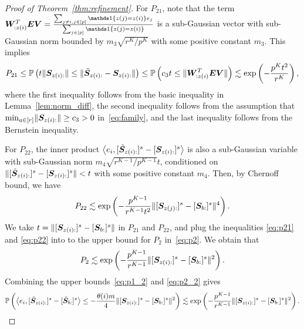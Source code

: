 \documentclass[lettersize,onecolumn,journal]{IEEEtran}
\theoremstyle{definition}
\theoremstyle{definition}
\newcommand{\of}[1]{\left(#1\right)}
\newcommand{\ang}[1]{\left\langle#1\right\rangle}
\begin{document}
\begin{proof}[Proof of Theorem~\ref{thm:refinement}]
    For $P_{21}$, note that the term $\mW^T_{: z(i)} \mE \mV = \frac{ \sum_{ j \neq i, j \in [p]} \ind \{ z(j) = z(i) \} e_j }{\sum_{j \in [p]} \ind \{ z(j) = z(i) \} }$  is a sub-Gaussian vector with sub-Gaussian norm bounded by $m_3 \sqrt{r^K/ p^K}$ with some positive constant $m_3$. This implies
        \begin{align}
        P_{21} \leq \bbP\of{ t \onormSize{}{\mS_{z(i):} } \leq \onormSize{}{ \tilde  \mS_{z(i):}  -  \mS_{z(i):} }  } \leq \bbP\of{c_3 t \leq  \onormSize{}{ \mW^T_{: z(i)} \mE \mV  } } 
        \lesssim \exp\of{ - \frac{p^K t^2}{r^K} }, \label{eq:p21}
    \end{align}
    where the first inequality follows from the basic inequality in Lemma~\ref{lem:norm_diff}, the second inequality follows from the assumption that $ \min_{a \in [r]} \lVert\bm S_{z(i):}\rVert \geq c_3>0$ in~\eqref{eq:family}, and the last inequality follows from the Bernstein inequality.
    
    For $P_{22}$, the inner product $ \ang{e_i, [ \tilde  \mS_{z(i):} ]^s - [ \mS_{z(i):} ]^s}$ is also a sub-Gaussian variable with sub-Gaussian norm $ m_4 \sqrt{ r^{K-1}/ p^{K-1} } t$, conditioned on $\lVert [ \tilde  {\bm S}_{z(i):} ]^s - [ \bm S_{z(i):} ]^s \rVert < t$ with some positive constant $m_4$. Then, by Chernoff bound, we have 
    \begin{equation}\label{eq:p22}
        P_{22} \lesssim \exp \of{  - \frac{p^{K-1}}{r^{K-1} t^2}   \onormSize{}{ [ \mS_{z(j):}  ]^s - [ \mS_{b:}  ]^s  }^4 }. 
    \end{equation}
    We take $t =  \lVert [ \bm S_{z(i):}  ]^s - [ \bm S_{b:}  ]^s  \rVert$ in $P_{21}$ and $P_{22}$, and plug the inequalities \eqref{eq:p21} and \eqref{eq:p22} into to the upper bound for $P_2$ in~\eqref{eq:p2}. We obtain that 
    \begin{equation}\label{eq:p2_2}
        P_2 \lesssim \exp \of{  - \frac{p^{K-1}}{r^{K-1}}   \onormSize{}{ [ \mS_{z(i):}  ]^s - [ \mS_{b:}  ]^s  }^2 }.
    \end{equation}
    Combining the upper bounds~\eqref{eq:p1_2} and \eqref{eq:p2_2} gives 
       \begin{equation}\label{eq:xi_p}
          \bbP \of{ \ang{ e_i, [  \tilde \mS_{z(i):} ]^s - [  \tilde \mS_{b:} ]^s }  \leq - \frac{\theta(i) m}{4} \onormSize{}{ [ \mS_{z(i):}  ]^s - [ \mS_{b:}  ]^s  }^2} \lesssim  \exp \of{  - \frac{p^{K-1}}{r^{K-1}}   \onormSize{}{ [ \mS_{z(i):}  ]^s - [ \mS_{b:}  ]^s  }^2 }.
    \end{equation}
    

\end{proof}
\end{document}
